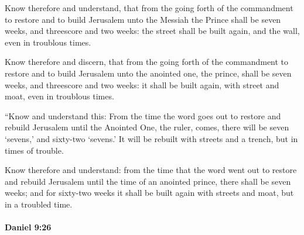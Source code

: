 			Know therefore and understand, that from the going forth of the commandment to restore and to build Jerusalem unto the Messiah the Prince shall be seven weeks, and threescore and two weeks: the street shall be built again, and the wall, even in troublous times.

			\begin{versebox}
					\item[BHS] 
					\item[LXX] 
					\item[ASV] Know therefore and discern, that from the going forth of the commandment to restore and to build Jerusalem unto the anointed one, the prince, shall be seven weeks, and threescore and two weeks: it shall be built again, with street and moat, even in troublous times.
					\item[NIV] “Know and understand this: From the time the word goes out to restore and rebuild Jerusalem until the Anointed One, the ruler, comes, there will be seven ‘sevens,’ and sixty-two ‘sevens.’ It will be rebuilt with streets and a trench, but in times of trouble.
					\item[NRSV] Know therefore and understand: from the time that the word went out to restore and rebuild Jerusalem until the time of an anointed prince, there shall be seven weeks; and for sixty-two weeks it shall be built again with streets and moat, but in a troubled time.
			\end{versebox}

		\paragraph{Daniel 9:26} %
			\label{DANIEL-9-26}

